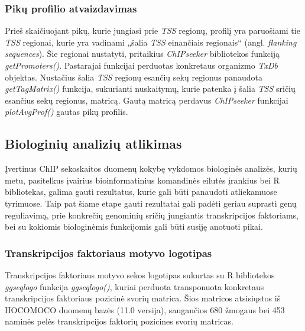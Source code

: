 \documentclass[12pt]{article}
\begin{document}
\subsubsection*{Pikų profilio atvaizdavimas}
Prieš skaičiuojant pikų, kurie jungiasi prie \emph{TSS} regionų, profilį yra
paruošiami tie \emph{TSS} regionai, kurie yra vadinami „šalia \emph{TSS}
einančiais regionais“ (angl. \emph{flanking sequences}). Šie regionai nustatyti,
pritaikius \emph{ChIPseeker} bibliotekos funkciją \emph{getPromoters()}.
Pastarajai funkcijai perduotas konkretaus organizmo \emph{TxDb} objektas.
Nustačius šalia \emph{TSS} regionų esančių sekų regionus panaudota
\emph{getTagMatrix()} funkcija, sukurianti nuskaitymų, kurie patenka į šalia
\emph{TSS} sričių esančius sekų regionus, matricą. Gautą matricą perdavus
\emph{ChIPseeker} funkcijai \emph{plotAvgProf()} gautas pikų profilis.

\newpage

\subsection{Biologinių analizių atlikimas}
Įvertinus ChIP sekoskaitos duomenų kokybę vykdomos biologinės analizės,
kurių metu, pasitelkus įvairius bioinformatinius komandinės eilutės įrankius
bei R bibliotekas, galima gauti rezultatus, kurie gali būti panaudoti
atliekamuose tyrimuose. Taip pat šiame etape gauti rezultatai gali padėti
geriau suprasti genų reguliavimą, prie konkrečių genominių sričių jungiantis
transkripcijos faktoriams, bei su kokiomis biologinėmis funkcijomis gali
būti susiję anotuoti pikai.

\subsubsection*{Transkripcijos faktoriaus motyvo logotipas}
Transkripcijos faktoriaus motyvo sekos logotipas sukurtas su R bibliotekos
\emph{ggseqlogo} \cite{GGSEQLOGO} funkcija \emph{ggseqlogo()}, kuriai perduota
transponuota konkretaus transkripcijos faktoriaus pozicinė svorių matrica.
Šios matricos atsisiųstos iš HOCOMOCO \cite{HOCOMOCO} duomenų bazės (11.0
versija), saugančios 680 žmogaus bei 453 naminės pelės transkripcijos faktorių
pozicines svorių matricas.
\end{document}
